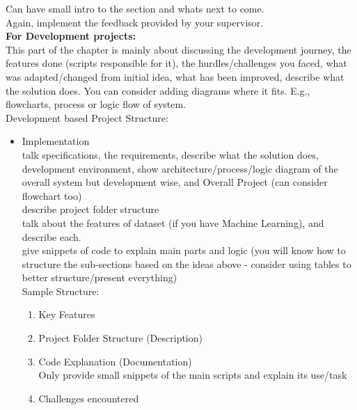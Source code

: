 Can have small intro to the section and whats next to come. \\
Again, implement the feedback provided by your supervisor. \\

\textbf{For Development projects:}\\
This part of the chapter is mainly about discussing the development journey, the features done (scripts responsible for it), the hurdles/challenges you faced, what was adapted/changed from initial idea, what has been improved, describe what the solution does.
You can consider adding diagrams where it fits. E.g., flowcharts, process or logic flow of system. \\


Development based Project Structure:
\begin{itemize}
    \item Implementation \\
talk specifications, the requirements, describe what the solution does, development environment, show architecture/process/logic diagram of the overall system but development wise, and Overall Project (can consider flowchart too) \\
describe project folder structure \\
talk about the features of dataset (if you have Machine Learning), and describe each. \\
give snippets of code to explain main parts and logic
(you will know how to structure the sub-sections based on the ideas above - consider using tables to better structure/present everything)\\
Sample Structure:
\begin{enumerate}[label=(\alph*)]
        \item Key Features
        \item Project Folder Structure (Description)
        \item Code Explanation (Documentation) \\
Only provide small snippets of the main scripts and explain its use/task
        \item Challenges encountered
    \end{enumerate}


\end{itemize}
